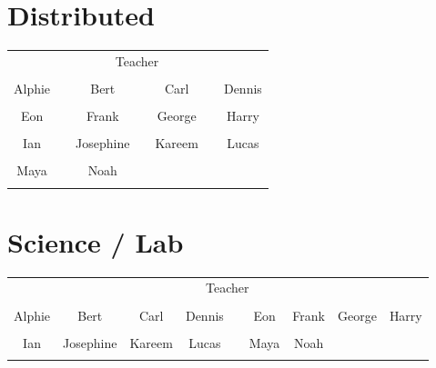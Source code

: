 \documentclass[landscape,a5paper]{article}
\begin{document}
\section{Distributed}
\begin{table}[ht]
\centering
\begin{tabular}{ccccccc}
\cline{3-5} &  & \multicolumn{3}{|c|}{Teacher} &  & \\\cline{3-5}\\\cline{1-1} \cline{3-3} \cline{5-5} \cline{7-7}
\multicolumn{1}{|c|}{Alphie} &  & \multicolumn{1}{|c|}{Bert} &  & \multicolumn{1}{|c|}{Carl} &  & \multicolumn{1}{|c|}{Dennis}\\\cline{1-1} \cline{3-3} \cline{5-5} \cline{7-7}
 &  &  &  &  &  & \\\cline{1-1} \cline{3-3} \cline{5-5} \cline{7-7}
\multicolumn{1}{|c|}{Eon} &  & \multicolumn{1}{|c|}{Frank} &  & \multicolumn{1}{|c|}{George} &  & \multicolumn{1}{|c|}{Harry}\\\cline{1-1} \cline{3-3} \cline{5-5} \cline{7-7}
 &  &  &  &  &  & \\\cline{1-1} \cline{3-3} \cline{5-5} \cline{7-7}
\multicolumn{1}{|c|}{Ian} &  & \multicolumn{1}{|c|}{Josephine} &  & \multicolumn{1}{|c|}{Kareem} &  & \multicolumn{1}{|c|}{Lucas}\\\cline{1-1} \cline{3-3} \cline{5-5} \cline{7-7}
 &  &  &  &  &  & \\\cline{1-1} \cline{3-3} \cline{5-5} \cline{7-7}
\multicolumn{1}{|c|}{Maya} &  & \multicolumn{1}{|c|}{Noah} &  & \multicolumn{1}{|c|}{} &  & \multicolumn{1}{|c|}{}\\\cline{1-1} \cline{3-3} \cline{5-5} \cline{7-7}
 &  &  &  &  &  & \\
\end{tabular}
\end{table}


\clearpage
\section{Science / Lab}
\begin{table}[ht]
\centering
\begin{tabular}{ccccccccc}
\cline{3-7} &  & \multicolumn{5}{|c|}{Teacher} &  & \\\cline{3-7}\\\cline{1-4} \cline{6-9}
\multicolumn{1}{|c|}{Alphie} & \multicolumn{1}{|c|}{Bert} & \multicolumn{1}{|c|}{Carl} & \multicolumn{1}{|c|}{Dennis} &  & \multicolumn{1}{|c|}{Eon} & \multicolumn{1}{|c|}{Frank} & \multicolumn{1}{|c|}{George} & \multicolumn{1}{|c|}{Harry}\\\cline{1-4} \cline{6-9}
 &  &  &  &  &  &  &  & \\\cline{1-4} \cline{6-9}
\multicolumn{1}{|c|}{Ian} & \multicolumn{1}{|c|}{Josephine} & \multicolumn{1}{|c|}{Kareem} & \multicolumn{1}{|c|}{Lucas} &  & \multicolumn{1}{|c|}{Maya} & \multicolumn{1}{|c|}{Noah} & \multicolumn{1}{|c|}{} & \multicolumn{1}{|c|}{}\\\cline{1-4} \cline{6-9}
 &  &  &  &  &  &  &  & \\
\end{tabular}
\end{table}
\end{document}
